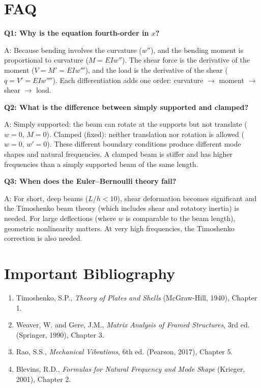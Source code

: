 \documentclass[11pt,openright]{book}
\begin{document}
\section*{FAQ}

\textbf{Q1: Why is the equation fourth-order in $x$?}

A: Because bending involves the curvature ($w''$), and the bending moment is proportional to curvature ($M = EIw''$). The shear force is the derivative of the moment ($V = M' = EIw'''$), and the load is the derivative of the shear ($q = V' = EIw''''$). Each differentiation adds one order: curvature $\to$ moment $\to$ shear $\to$ load.

\textbf{Q2: What is the difference between simply supported and clamped?}

A: Simply supported: the beam can rotate at the supports but not translate ($w = 0$, $M = 0$). Clamped (fixed): neither translation nor rotation is allowed ($w = 0$, $w' = 0$). These different boundary conditions produce different mode shapes and natural frequencies. A clamped beam is stiffer and has higher frequencies than a simply supported beam of the same length.

\textbf{Q3: When does the Euler--Bernoulli theory fail?}

A: For short, deep beams ($L/h < 10$), shear deformation becomes significant and the Timoshenko beam theory (which includes shear and rotatory inertia) is needed. For large deflections (where $w$ is comparable to the beam length), geometric nonlinearity matters. At very high frequencies, the Timoshenko correction is also needed.
\section*{Important Bibliography}

\begin{enumerate}
\item Timoshenko, S.P., \textit{Theory of Plates and Shells} (McGraw-Hill, 1940), Chapter 1.
\item Weaver, W. and Gere, J.M., \textit{Matrix Analysis of Framed Structures}, 3rd ed. (Springer, 1990), Chapter 3.
\item Rao, S.S., \textit{Mechanical Vibrations}, 6th ed. (Pearson, 2017), Chapter 5.
\item Blevins, R.D., \textit{Formulas for Natural Frequency and Mode Shape} (Krieger, 2001), Chapter 2.
\end{enumerate}

\end{document}
